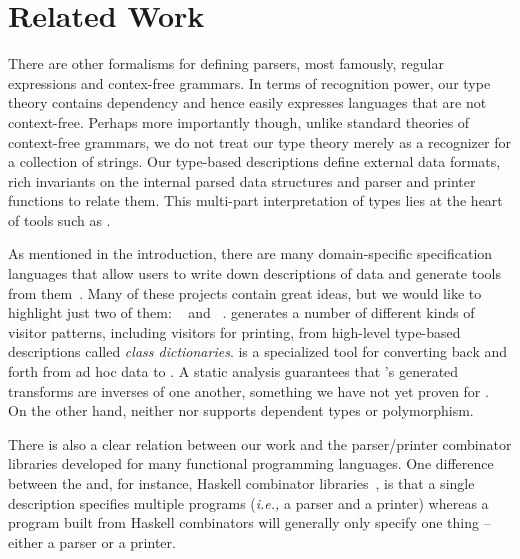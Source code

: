 \section{Related Work}
\label{sec:related}

There are other formalisms for
defining parsers, most famously, regular expressions and contex-free
grammars.  In terms of recognition power, our type theory contains
dependency and hence easily expresses languages that are not
context-free.  Perhaps more importantly though, unlike
standard theories of context-free grammars, we do not treat our type
theory merely as a recognizer for a collection of strings.  Our
type-based descriptions define external data formats, rich invariants 
on the internal parsed data structures and parser and printer
functions to relate them.  This
multi-part interpretation of types lies at the heart of 
tools such as \pads{}.

As mentioned in the introduction, there are many domain-specific
specification languages that allow users to write down descriptions
of data and generate tools from them~\cite{gpce02,lieberherr+:class-dictionaries,sigcomm00,fisher+:pads,mandelbaum+:padsml,xsugar2005}.  Many of these projects contain great ideas, 
but we would like to highlight just two of them:
\demeter~\cite{lieberherr+:class-dictionaries} and 
\xsugar~\cite{xsugar2005}.  \demeter{} generates a number of different kinds of visitor patterns, including visitors for printing, from high-level 
type-based descriptions called {\em class dictionaries}.  \xsugar{}
is a specialized tool for converting back and forth from ad hoc data
to \xml.  A static analysis guarantees that \xsugar{}'s generated
transforms are inverses of one another, something we have not yet proven
for \ddc{}.  On the other hand, neither \demeter{} nor \xsugar{} supports
dependent types or polymorphism.


There is also a clear relation between our work and the parser/printer
combinator libraries developed for many functional programming languages.
One difference between the \ddc{} and, for instance, Haskell
combinator libraries~\cite{hutton+:parser-combinators,wadler99prettier}, is that a single \ddc{} description specifies
multiple programs ({\em i.e.,} a parser and a printer) whereas
a program built from Haskell combinators will generally only specify 
one thing -- either a parser or a printer.  

